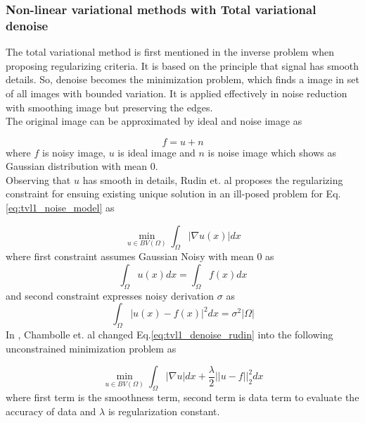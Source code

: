 \subsubsection{Non-linear variational methods with Total variational denoise}

The total variational method is first mentioned in the inverse problem when proposing regularizing criteria. It is based on the principle that signal has smooth details. So, denoise becomes the minimization problem, which finds a image in set of all images with bounded variation. It is applied effectively in noise reduction with smoothing image but preserving the edges.\cite{Rudin1992}\\
The original image can be approximated by ideal and noise image as

\begin{equation}
    \label{eq:tvl1_noise_model}
    f = u + n
\end{equation}
where $f$ is noisy image, $u$ is ideal image and $n$ is noise image which shows as Gaussian distribution with mean $0$.\\
Observing that $u$ has smooth in details, Rudin et. al \cite{Rudin1992} proposes the regularizing constraint for ensuing existing unique solution in an ill-posed problem for Eq.\ref{eq:tvl1_noise_model} as

\begin{equation}
    \label{eq:tvl1_denoise_rudin}
    \min_{u \in BV\left( \Omega \right)}\int_{\Omega}\left| \nabla u \left( x \right) \right|dx
\end{equation}
where first constraint assumes Gaussian Noisy with mean $0$ as\\

\begin{equation}
    \label{eq:tvl1_denoise_rudin_constraint_1}
    \int_{\Omega}u\left( x \right)dx = \int_{\Omega}f\left(x\right)dx
\end{equation}
and second constraint expresses noisy derivation $\sigma$ as\\

\begin{equation}
    \label{eq:tvl1_denoise_rudin_constraint_2}
    \int_{\Omega}\left| u \left( x \right) - f \left( x \right)\right|^{2}dx = \sigma^{2}\left|\Omega\right|
\end{equation}
In \cite{Chambolle2010}, Chambolle et. al changed Eq.\ref{eq:tvl1_denoise_rudin} into the following unconstrained minimization problem as

\begin{equation}
\label{eq:tvl1_denoise_rof}
\min_{u \in BV\left( \Omega \right)}\int_{\Omega}\left| \nabla u \right|dx + \frac{\lambda}{2}\left||u - f\right||_{2}^{2}dx
\end{equation}
where first term is the smoothness term, second term is data term to evaluate the accuracy of data and $\lambda$ is regularization constant.

